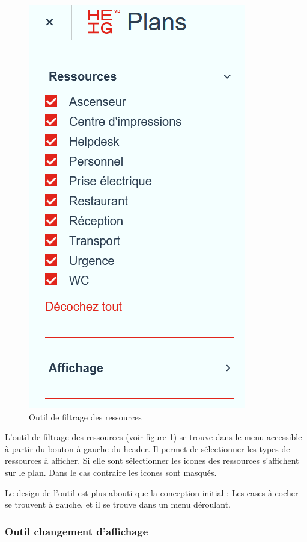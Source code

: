 \documentclass[
    iai, %
    il, %
]{heig-tb}
\begin{document}
\begin{figure}[h]
    \centering
    \includegraphics[scale=0.5]{frontend-filtresRessources.png}
    \caption{Outil de filtrage des ressources}
    \label{fig:ressources-filtre}
\end{figure}

L'outil de filtrage des ressources (voir figure \ref{fig:ressources-filtre}) se trouve dans le menu accessible à partir du bouton à gauche du header.
Il permet de sélectionner les types de ressources à afficher.
Si elle sont sélectionner les icones des ressources s'affichent sur le plan.
Dans le cas contraire les icones sont masqués.

Le design de l'outil est plus abouti que la conception initial : Les cases à cocher se trouvent à gauche, et
il se trouve dans un menu déroulant.

\subsubsection{Outil changement d'affichage}
\end{document}
